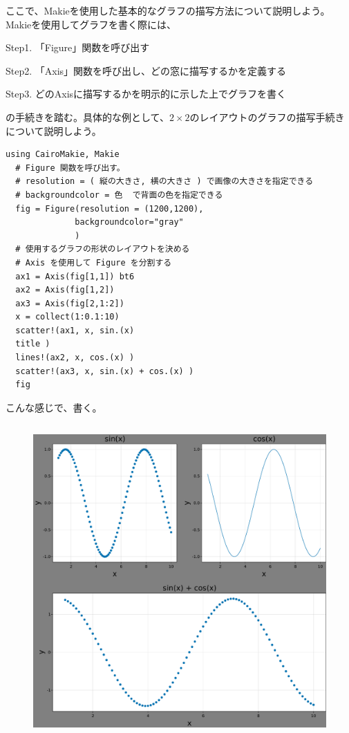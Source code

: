 \documentclass[11pt,dvipdfmx,b5paper,oneside]{jsbook}
\begin{document}
ここで、Makieを使用した基本的なグラフの描写方法について説明しよう。Makieを使用してグラフを書く際には、
\begin{description}
 \item{Step1. } 「Figure」関数を呼び出す
 \item{Step2. } 「Axis」関数を呼び出し、どの窓に描写するかを定義する
 \item{Step3. } どのAxisに描写するかを明示的に示した上でグラフを書く
\end{description}
の手続きを踏む。具体的な例として、$2\times2$のレイアウトのグラフの描写手続きについて説明しよう。
\begin{lstlisting}[title=Example]
  using CairoMakie, Makie
  # Figure 関数を呼び出す。
  # resolution = ( 縦の大きさ, 横の大きさ ) で画像の大きさを指定できる
  # backgroundcolor = 色  で背面の色を指定できる
  fig = Figure(resolution = (1200,1200), 
              backgroundcolor="gray"
              )
  # 使用するグラフの形状のレイアウトを決める
  # Axis を使用して Figure を分割する
  ax1 = Axis(fig[1,1]) bt6
  ax2 = Axis(fig[1,2])
  ax3 = Axis(fig[2,1:2])
  x = collect(1:0.1:10)
  scatter!(ax1, x, sin.(x)
  title )
  lines!(ax2, x, cos.(x) )
  scatter!(ax3, x, sin.(x) + cos.(x) )
  fig
\end{lstlisting}
こんな感じで、書く。

\begin{figure}[h]
  \centering
  \includegraphics[keepaspectratio, width=12cm, height=12cm]{example1.pdf}
 \end{figure}
\end{document}
